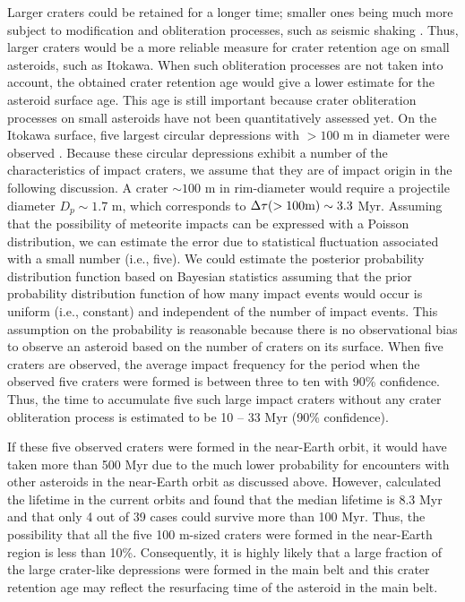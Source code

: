 \documentclass[3p,authoryear]{elsarticle}
\begin{document}
Larger craters could be retained for a longer time; smaller ones being much more subject to modification and obliteration processes, such as seismic shaking \citep[i.e.,][]{michel2009}.
Thus, larger craters would be a more reliable measure for crater retention age on small asteroids, such as Itokawa.
When such obliteration processes are not taken into account, the obtained crater retention age would give a lower estimate for the asteroid surface age.
This age is still important because crater obliteration processes on small asteroids have not been quantitatively assessed yet.
On the Itokawa surface, five largest circular depressions with $>100$ m in diameter were observed \citep{hirata2009}.
Because these circular depressions exhibit a number of the characteristics of impact craters, we assume that they are of impact origin in the following discussion.
A crater $\sim 100$ m in rim-diameter would require a projectile diameter $D_p\sim 1.7$ m, which corresponds to $\Delta \tau (>100 \rm{m})\sim 3.3$ Myr.
Assuming that the possibility of meteorite impacts can be expressed with a Poisson distribution, we can estimate the error due to statistical fluctuation associated with a small number (i.e., five). We could estimate the posterior probability distribution function based on Bayesian statistics assuming that the prior probability distribution function of how many impact events would occur is uniform (i.e., constant) and independent of the number of impact events.
This assumption on the probability is reasonable because there is no observational bias to observe an asteroid based on the number of craters on its surface.
When five craters are observed, the average impact frequency for the period when the observed five craters were formed is between three to ten with 90\% confidence.
Thus, the time to accumulate five such large impact craters without any crater obliteration process is estimated to be 10 -- 33 Myr (90\% confidence).

If these five observed craters were formed in the near-Earth orbit, it would have taken more than 500 Myr due to the much lower probability for encounters with other asteroids in the near-Earth orbit as discussed above.
However, \citet{michel2005} calculated the lifetime in the current orbits and found that the median lifetime is 8.3 Myr and that only 4 out of 39 cases could survive more than 100 Myr.
Thus, the possibility that all the five 100 m-sized craters were formed in the near-Earth region is less than 10\%.
Consequently, it is highly likely that a large fraction of the large crater-like depressions were formed in the main belt and this crater retention age may reflect the resurfacing time of the asteroid in the main belt.
\end{document}
